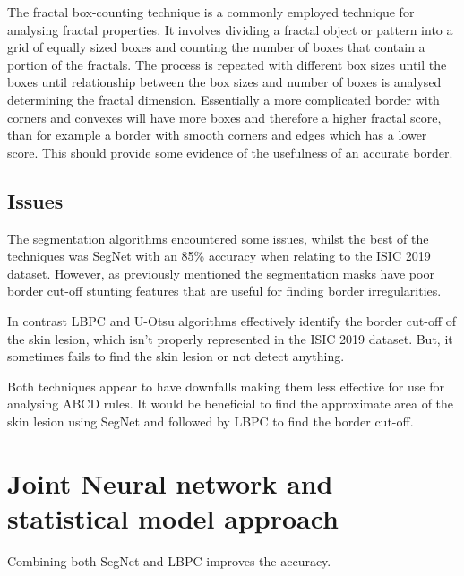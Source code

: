 The fractal box-counting technique is a commonly employed technique for analysing fractal properties. It involves dividing a fractal object or pattern into a grid of equally sized boxes and counting the number of boxes that contain a portion of the fractals. The process is repeated with different box sizes until the boxes until relationship between the box sizes and number of boxes is analysed determining the fractal dimension\cite{Hamburger1996}. Essentially a more complicated border with corners and convexes will have more boxes and therefore a higher fractal score, than for example a border with smooth corners and edges which has a lower score. This should provide some evidence of the usefulness of an accurate border.

\subsection{Issues}
The segmentation algorithms encountered some issues, whilst the best of the techniques was SegNet with an 85\% accuracy when relating to the ISIC 2019 dataset. However, as previously mentioned the segmentation masks have poor border cut-off stunting features that are useful for finding border irregularities. 

In contrast LBPC and U-Otsu algorithms effectively identify the border cut-off of the skin lesion, which isn't properly represented in the ISIC 2019 dataset. But, it sometimes fails to find the skin lesion or not detect anything. 

Both techniques appear to have downfalls making them less effective for use for analysing ABCD rules. It would be beneficial to find the approximate area of the skin lesion using SegNet and followed by LBPC to find the border cut-off.

\section{Joint Neural network and statistical model approach}
Combining both SegNet and LBPC improves the accuracy.


















